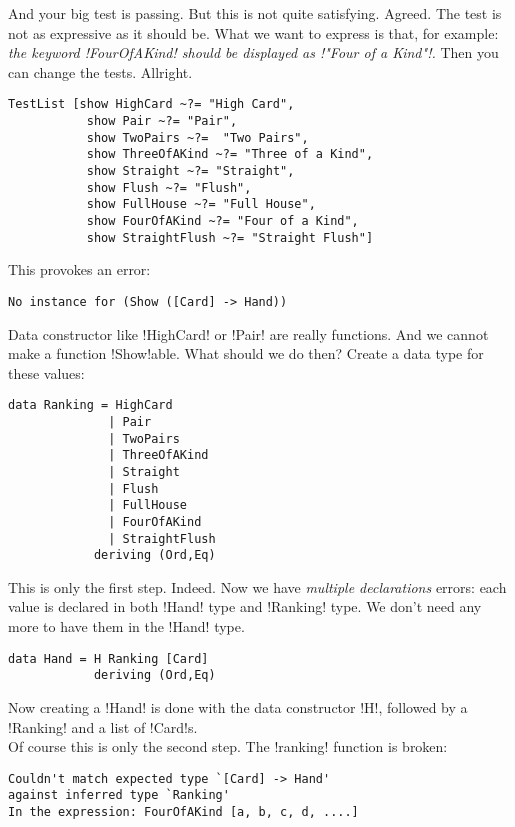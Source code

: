 \success And your big test is passing. But this is not quite satisfying.
\lhN Agreed. The test is not as expressive as it should be. What we want to express is that, for example: \\
\emph{the keyword \il!FourOfAKind! should be displayed as \il!"Four of a Kind"!.}
\lhA Then you can change the tests.
\lhN Allright.
\begin{lstlisting}[frame=single]
 TestList [show HighCard ~?= "High Card",
           show Pair ~?= "Pair",
           show TwoPairs ~?=  "Two Pairs",
           show ThreeOfAKind ~?= "Three of a Kind",
           show Straight ~?= "Straight",
           show Flush ~?= "Flush",
           show FullHouse ~?= "Full House",
           show FourOfAKind ~?= "Four of a Kind",
           show StraightFlush ~?= "Straight Flush"] 
\end{lstlisting}
\error This provokes an error:
\begin{small}
\begin{verbatim}
No instance for (Show ([Card] -> Hand))
\end{verbatim}
\end{small}
\lhA \error Data constructor like \il!HighCard! or \il!Pair! are really functions. And we cannot make a function \il!Show!able.
\lhN What should we do then?
\lhA Create a data type for these values:
\begin{lstlisting}[frame=single]
data Ranking = HighCard
              | Pair
              | TwoPairs
              | ThreeOfAKind
              | Straight
              | Flush
              | FullHouse
              | FourOfAKind
              | StraightFlush
            deriving (Ord,Eq)
\end{lstlisting}
\error This is only the first step.
\lhN Indeed. Now we have \emph{multiple declarations} errors: each value is declared in both \il!Hand! type and \il!Ranking! type.
\lhA We don't need any more to have them in the \il!Hand! type. 
\begin{lstlisting}[frame=single]
data Hand = H Ranking [Card]
            deriving (Ord,Eq)
\end{lstlisting}            
\error Now creating a \il!Hand! is done with the data constructor \il!H!, followed by a \il!Ranking! and a list of \il!Card!s. \\ Of course this is only the second step.
\lhN The \il!ranking! function is broken: \\
\begin{small}
\begin{verbatim}
Couldn't match expected type `[Card] -> Hand'
against inferred type `Ranking'
In the expression: FourOfAKind [a, b, c, d, ....]
\end{verbatim}
\end{small}
